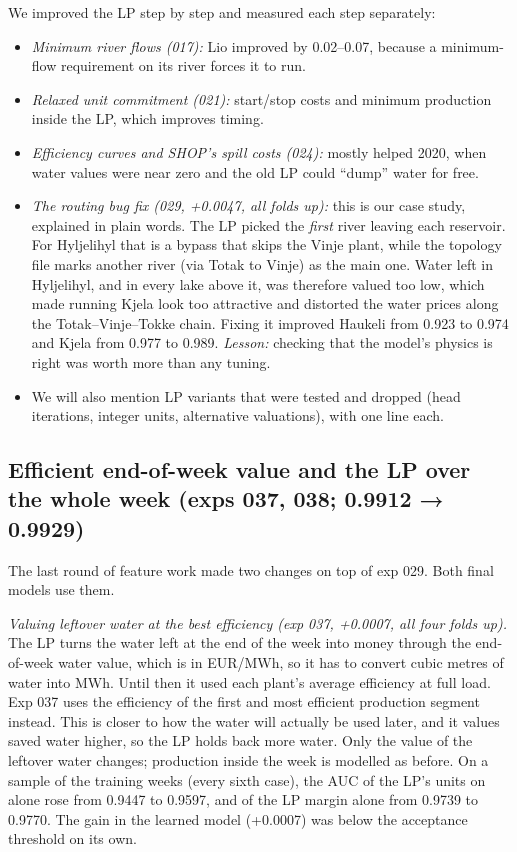 \begin{disposition}
We improved the LP step by step and measured each step separately:

\begin{itemize}
\tightlist
\item
  \emph{Minimum river flows (017):} Lio improved by 0.02--0.07, because a minimum-flow requirement on its river forces it to run.
\item
  \emph{Relaxed unit commitment (021):} start/stop costs and minimum production inside the LP, which improves timing.
\item
  \emph{Efficiency curves and SHOP's spill costs (024):} mostly helped 2020, when water values were near zero and the old LP could ``dump'' water for free.
\item
  \emph{The routing bug fix (029, +0.0047, all folds up):} this is our case study, explained in plain words. The LP picked the \emph{first} river leaving each reservoir. For Hyljelihyl that is a bypass that skips the Vinje plant, while the topology file marks another river (via Totak to Vinje) as the main one. Water left in Hyljelihyl, and in every lake above it, was therefore valued too low, which made running Kjela look too attractive and distorted the water prices along the Totak--Vinje--Tokke chain. Fixing it improved Haukeli from 0.923 to 0.974 and Kjela from 0.977 to 0.989. \emph{Lesson:} checking that the model's physics is right was worth more than any tuning.
\item
  We will also mention LP variants that were tested and dropped (head iterations, integer units, alternative valuations), with one line each.
\end{itemize}
\end{disposition}



\subsection{Efficient end-of-week value and the LP over the whole week (exps 037, 038; 0.9912 → 0.9929)}\label{sec:4.lpweek}

The last round of feature work made two changes on top of exp 029. Both final models use them.

\emph{Valuing leftover water at the best efficiency (exp 037, +0.0007, all four folds up).} The LP turns the water left at the end of the week into money through the end-of-week water value, which is in EUR/MWh, so it has to convert cubic metres of water into MWh. Until then it used each plant's average efficiency at full load. Exp 037 uses the efficiency of the first and most efficient production segment instead. This is closer to how the water will actually be used later, and it values saved water higher, so the LP holds back more water. Only the value of the leftover water changes; production inside the week is modelled as before. On a sample of the training weeks (every sixth case), the AUC of the LP's units on alone rose from 0.9447 to 0.9597, and of the LP margin alone from 0.9739 to 0.9770. The gain in the learned model (+0.0007) was below the acceptance threshold on its own.

